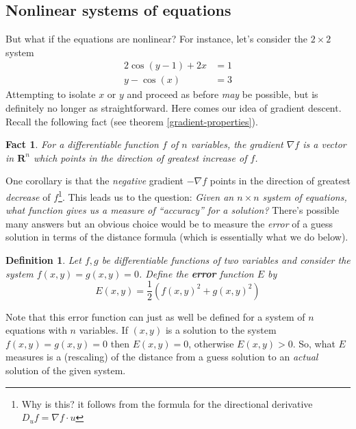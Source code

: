 \documentclass[12pt]{article}
\numberwithin{equation}{subsection}
\numberwithin{figure}{subsection}
\newtheorem{defn}[subsection]{Definition}
\newtheorem{fact}[subsection]{Fact}
\theoremstyle{note}
\begin{document}
{\subsection{Nonlinear systems of equations}
But what if the equations are nonlinear? For instance, let's consider the $2\times 2$ system 
\begin{align}
2\cos(y-1)+2x&=1 \nonumber \\ y-\cos(x) &=3 \label{sys-2} \end{align}
Attempting to isolate $x$ or $y$ and proceed as before \textit{may} be possible, but is definitely no longer as straightforward. Here comes our idea of gradient descent. Recall the following fact (see theorem \ref{gradient-properties}).

\begin{fact}For a differentiable function $f$ of $n$ variables, the gradient $\nabla f$ is a vector in $\mathbf{R}^n$ which points in the direction of greatest increase of $f$. \end{fact}

One corollary is that the \textit{negative} gradient $-\nabla f$ points in the direction of greatest \textit{decrease} of $f$\footnote{Why is this? it follows from the formula for the directional derivative $D_uf=\nabla f \cdot u$}. This leads us to the question: \textit{Given an $n\times n$ system of equations, what function gives us a measure of ``accuracy'' for a solution?} There's possible many answers but an obvious choice would be to measure the \textit{error} of a guess solution in terms of the distance formula (which is essentially what we do below). 

\begin{defn} Let $f,g$ be differentiable functions of two variables and consider the system $f(x,y)=g(x,y)=0$. Define the \textbf{error} function $E$ by \begin{equation} \label{error} E(x,y)=\dfrac{1}{2} \left( f(x,y)^2 + g(x,y)^2 \right)\end{equation} \end{defn}

Note that this error function can just as well be defined for a system of $n$ equations with $n$ variables. If $(x,y)$ is a solution to the system $f(x,y)=g(x,y)=0$ then $E(x,y)=0$, otherwise $E(x,y)>0$. So, what $E$ measures is a (rescaling) of the distance from a guess solution to an \textit{actual} solution of the given system. 

}
\end{document}
